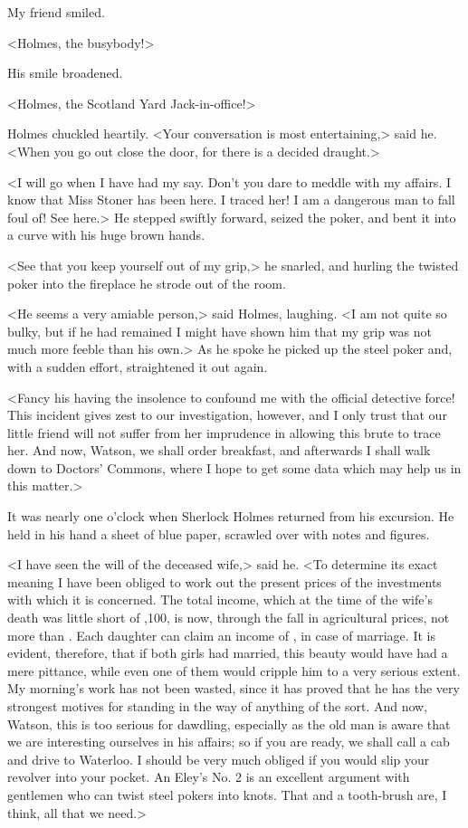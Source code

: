 My friend smiled.

<Holmes, the busybody!>

His smile broadened.

<Holmes, the Scotland Yard Jack-in-office!>

Holmes chuckled heartily. <Your conversation is most entertaining,> said he. <When you go out close the door, for there is a decided draught.>

<I will go when I have had my say. Don't you dare to meddle with my affairs. I know that Miss Stoner has been here. I traced her! I am a dangerous man to fall foul of! See here.> He stepped swiftly forward, seized the poker, and bent it into a curve with his huge brown hands.

<See that you keep yourself out of my grip,> he snarled, and hurling the twisted poker into the fireplace he strode out of the room.

<He seems a very amiable person,> said Holmes, laughing. <I am not quite so bulky, but if he had remained I might have shown him that my grip was not much more feeble than his own.> As he spoke he picked up the steel poker and, with a sudden effort, straightened it out again.

<Fancy his having the insolence to confound me with the official detective force! This incident gives zest to our investigation, however, and I only trust that our little friend will not suffer from her imprudence in allowing this brute to trace her. And now, Watson, we shall order breakfast, and afterwards I shall walk down to Doctors' Commons, where I hope to get some data which may help us in this matter.>

It was nearly one o'clock when Sherlock Holmes returned from his excursion. He held in his hand a sheet of blue paper, scrawled over with notes and figures.

<I have seen the will of the deceased wife,> said he. <To determine its exact meaning I have been obliged to work out the present prices of the investments with which it is concerned. The total income, which at the time of the wife's death was little short of ,100, is now, through the fall in agricultural prices, not more than . Each daughter can claim an income of , in case of marriage. It is evident, therefore, that if both girls had married, this beauty would have had a mere pittance, while even one of them would cripple him to a very serious extent. My morning's work has not been wasted, since it has proved that he has the very strongest motives for standing in the way of anything of the sort. And now, Watson, this is too serious for dawdling, especially as the old man is aware that we are interesting ourselves in his affairs; so if you are ready, we shall call a cab and drive to Waterloo. I should be very much obliged if you would slip your revolver into your pocket. An Eley's No. 2 is an excellent argument with gentlemen who can twist steel pokers into knots. That and a tooth-brush are, I think, all that we need.>

